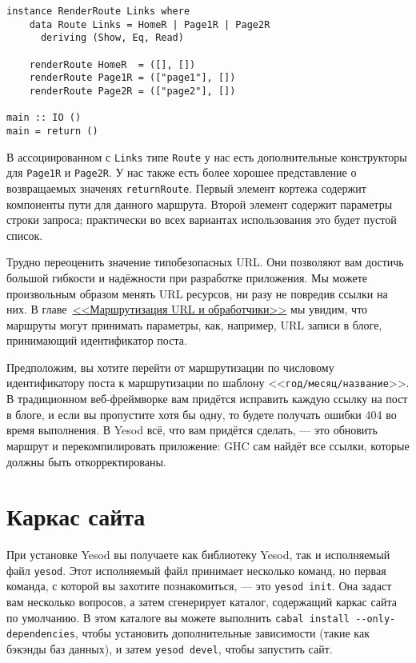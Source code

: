 \begin{lstlisting}
instance RenderRoute Links where
    data Route Links = HomeR | Page1R | Page2R
      deriving (Show, Eq, Read)

    renderRoute HomeR  = ([], [])
    renderRoute Page1R = (["page1"], [])
    renderRoute Page2R = (["page2"], [])

main :: IO ()
main = return ()
\end{lstlisting}

В ассоциированном с \lstinline!Links! типе \lstinline!Route! у нас есть дополнительные
конструкторы для \lstinline!Page1R! и \lstinline!Page2R!. У нас также есть более хорошее
представление о возвращаемых значенях \lstinline!returnRoute!. Первый элемент кортежа содержит
компоненты пути для данного маршрута. Второй элемент содержит параметры строки запроса;
практически во всех вариантах использования это будет пустой список.

Трудно переоценить значение типобезопасных URL. Они позволяют вам достичь большой гибкости
и надёжности при разработке приложения. Мы можете произвольным образом менять URL
ресурсов, ни разу не повредив ссылки на них. В главе~\hyperref[ch:routing]{<<Маршрутизация
  URL и обработчики>>} мы увидим, что маршруты могут принимать параметры, как, например,
URL записи в блоге, принимающий идентификатор поста.

Предположим, вы хотите перейти от маршрутизации по числовому идентификатору поста к
маршрутизации по шаблону <<\texttt{год/месяц/название}>>. В традиционном веб-фреймворке
вам придётся исправить каждую ссылку на пост в блоге, и если вы пропустите хотя бы одну,
то будете получать ошибки 404 во время выполнения. В Yesod всё, что вам придётся сделать,
--- это обновить маршрут и перекомпилировать приложение: GHC сам найдёт все ссылки,
которые должны быть откорректированы.

\section{Каркас сайта}

При установке Yesod вы получаете как библиотеку Yesod, так и исполняемый файл
\lstinline!yesod!. Этот исполняемый файл принимает несколько команд, но первая команда, с
которой вы захотите познакомиться, --- это \lstinline!yesod init!. Она задаст вам
несколько вопросов, а затем сгенерирует каталог, содержащий каркас сайта по умолчанию. В
этом каталоге вы можете выполнить \lstinline'cabal install --only-dependencies', чтобы
установить дополнительные зависимости (такие как бэкэнды баз данных), и затем
\lstinline'yesod devel', чтобы запустить сайт.

